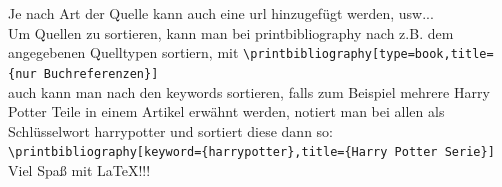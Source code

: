 \documentclass[ngerman]{scrreport}
\begin{document}
Je nach Art der Quelle kann auch eine url hinzugefügt werden, usw...\\
Um Quellen zu sortieren, kann man bei printbibliography nach z.B. dem angegebenen Quelltypen sortiern, mit {\color{blue}\verb|\printbibliography[type=book,title={nur Buchreferenzen}]|}\\
auch kann man nach den keywords sortieren, falls zum Beispiel mehrere Harry Potter Teile in einem Artikel erwähnt werden, notiert man bei allen als Schlüsselwort harrypotter und sortiert diese dann so: {\color{blue}\verb|\printbibliography[keyword={harrypotter},title={Harry Potter Serie}]|}\\

\vspace{2cm}
{\huge Viel Spaß mit \LaTeX{!!!}}

\printbibliography[title={Bücher}]
\end{document}
